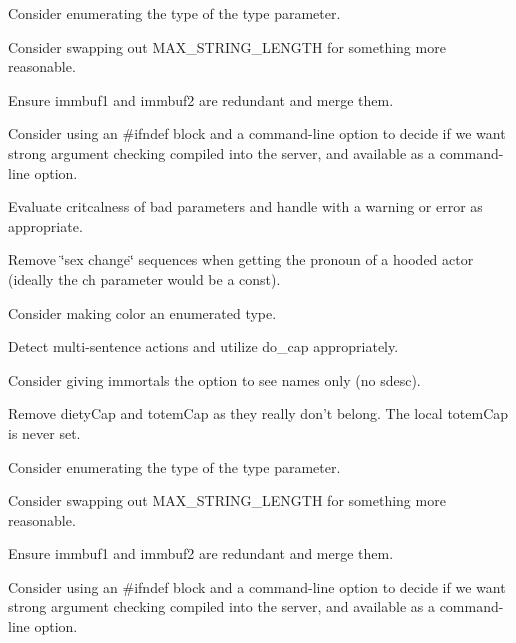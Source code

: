 
\begin{DoxyRefList}
\item[\label{todo__todo000005}%
\hypertarget{todo__todo000005}{}%
Member \hyperlink{protos_8h_a29015b49161d76d2daed3b9793c9124f}{act} (char $\ast$str, int hide\-\_\-invisible, C\-H\-A\-R\-\_\-\-D\-A\-T\-A $\ast$ch, O\-B\-J\-\_\-\-D\-A\-T\-A $\ast$obj, void $\ast$vict\-\_\-obj, int type)]Consider enumerating the type of the {\ttfamily type} parameter. 

Consider swapping out {\ttfamily M\-A\-X\-\_\-\-S\-T\-R\-I\-N\-G\-\_\-\-L\-E\-N\-G\-T\-H} for something more reasonable. 

Ensure {\ttfamily immbuf1} and {\ttfamily immbuf2} are redundant and merge them. 

Consider using an \#ifndef block and a command-\/line option to decide if we want strong argument checking compiled into the server, and available as a command-\/line option. 

Evaluate critcalness of bad parameters and handle with a warning or error as appropriate. 

Remove \char`\"{}sex change\char`\"{} sequences when getting the pronoun of a hooded actor (ideally the {\ttfamily ch} parameter would be a const). 

Consider making {\ttfamily color} an enumerated type. 

Detect multi-\/sentence actions and utilize {\ttfamily do\-\_\-cap} appropriately. 

Consider giving immortals the option to see names only (no sdesc). 

Remove {\ttfamily diety\-Cap} and {\ttfamily totem\-Cap} as they really don't belong. The local {\ttfamily totem\-Cap} is never set.  
\item[\label{todo__todo000005}%
\hypertarget{todo__todo000005}{}%
Member \hyperlink{protos_8h_a29015b49161d76d2daed3b9793c9124f}{act} (char $\ast$str, int hide\-\_\-invisible, C\-H\-A\-R\-\_\-\-D\-A\-T\-A $\ast$ch, O\-B\-J\-\_\-\-D\-A\-T\-A $\ast$obj, void $\ast$vict\-\_\-obj, int type)]Consider enumerating the type of the {\ttfamily type} parameter. 

Consider swapping out {\ttfamily M\-A\-X\-\_\-\-S\-T\-R\-I\-N\-G\-\_\-\-L\-E\-N\-G\-T\-H} for something more reasonable. 

Ensure {\ttfamily immbuf1} and {\ttfamily immbuf2} are redundant and merge them. 

Consider using an \#ifndef block and a command-\/line option to decide if we want strong argument checking compiled into the server, and available as a command-\/line option. 


\end{DoxyRefList}
